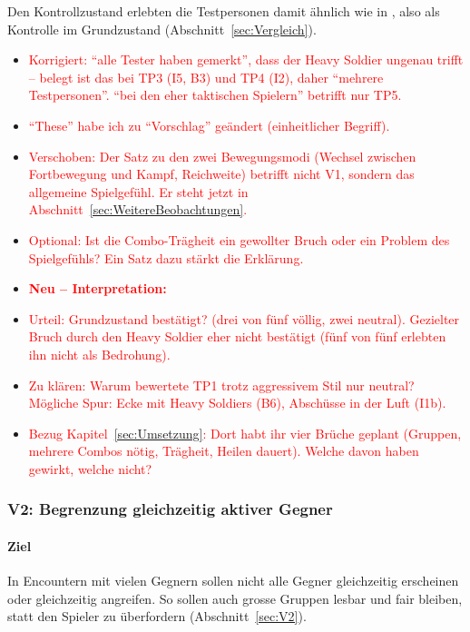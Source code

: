 \documentclass[../Main.tex]{subfiles}
\begin{document}
Den Kontrollzustand erlebten die Testpersonen damit ähnlich wie in , also als Kontrolle im Grundzustand (Abschnitt~\ref{sec:Vergleich}).

\begin{itemize}[leftmargin=1.5cm]
    \item \textcolor{red}{Korrigiert: \enquote{alle Tester haben gemerkt}, dass der Heavy Soldier ungenau trifft -- belegt ist das bei TP3 (I5, B3) und TP4 (I2), daher \enquote{mehrere Testpersonen}. \enquote{bei den eher taktischen Spielern} betrifft nur TP5.}
    \item \textcolor{red}{\enquote{These} habe ich zu \enquote{Vorschlag} geändert (einheitlicher Begriff).}
    \item \textcolor{red}{Verschoben: Der Satz zu den zwei Bewegungsmodi (Wechsel zwischen Fortbewegung und Kampf, Reichweite) betrifft nicht V1, sondern das allgemeine Spielgefühl. Er steht jetzt in Abschnitt~\ref{sec:WeitereBeobachtungen}.}
    \item \textcolor{red}{Optional: Ist die Combo-Trägheit ein gewollter Bruch oder ein Problem des Spielgefühls? Ein Satz dazu stärkt die Erklärung.}
\end{itemize}

\begin{itemize}[leftmargin=1.5cm]
    \item \textcolor{red}{\textbf{Neu -- Interpretation:}}
    \item \textcolor{red}{Urteil: Grundzustand bestätigt? (drei von fünf völlig, zwei neutral). Gezielter Bruch durch den Heavy Soldier eher nicht bestätigt (fünf von fünf erlebten ihn nicht als Bedrohung).}
    \item \textcolor{red}{Zu klären: Warum bewertete TP1 trotz aggressivem Stil nur neutral? Mögliche Spur: Ecke mit Heavy Soldiers (B6), Abschüsse in der Luft (I1b).}
    \item \textcolor{red}{Bezug Kapitel~\ref{sec:Umsetzung}: Dort habt ihr vier Brüche geplant (Gruppen, mehrere Combos nötig, Trägheit, Heilen dauert). Welche davon haben gewirkt, welche nicht?}
\end{itemize}

\subsubsection{V2: Begrenzung gleichzeitig aktiver Gegner}

\paragraph{Ziel}
In Encountern mit vielen Gegnern sollen nicht alle Gegner gleichzeitig erscheinen oder gleichzeitig angreifen. So sollen auch grosse Gruppen lesbar und fair bleiben, statt den Spieler zu überfordern (Abschnitt~\ref{sec:V2}).
\end{document}
